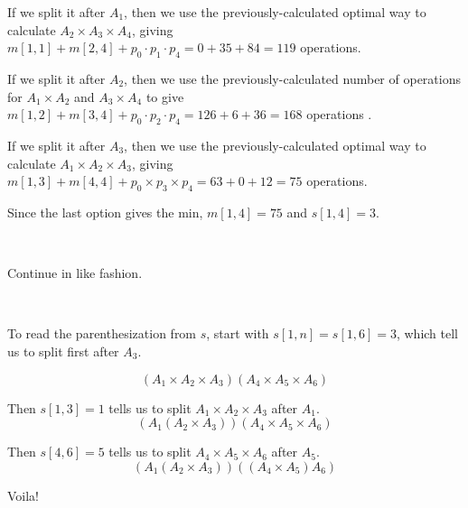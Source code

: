 If we split it after $A_1$, then we use the previously-calculated optimal way to calculate $A_2 \times A_3 \times A_4$, giving $m[1,1] + m[2,4] + p_0 \cdot p_1 \cdot p_4 = 0 + 35 + 84 = 119$ operations.  

If we split it after $A_2$, then we use the previously-calculated number of operations for $A_1 \times A_2$ and $A_3 \times A_4$ to give $m[1,2] + m[3,4] + p_0 \cdot p_2 \cdot p_4 = 126 + 6 + 36 = 168$ operations . 

If we split it after $A_3$, then we use the previously-calculated optimal way to calculate $A_1 \times A_2 \times A_3$, giving $m[1,3] + m[4,4] + p_0 \times p_3 \times p_4 = 63 + 0 + 12 = 75$ operations.  

Since the last option gives the min, $m[1,4] = 75$ and $s[1,4] = 3$.

\

Continue in like fashion.  

\

To read the parenthesization from $s$, start with $s[1,n] = s[1,6] = 3$, which tell us to split first after $A_3$.  

$$\left( A_1 \times A_2 \times A_3 \right) \left( A_4 \times A_5 \times A_6\right) $$

Then $s[1,3] = 1$ tells us to split $A_1 \times A_2 \times A_3$ after $A_1$.
$$\left( A_1  \left( A_2 \times A_3 \right) \right) \left( A_4 \times A_5 \times A_6\right) $$

Then $s[4,6] = 5$ tells us to split $A_4 \times A_5 \times A_6$ after $A_5$.  
$$\left( A_1  \left( A_2 \times A_3 \right) \right) \left( \left( A_4 \times A_5 \right) A_6\right) $$

Voila!



